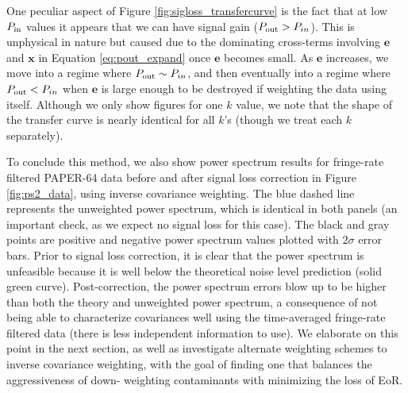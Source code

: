 \documentclass[preprint2,numberedappendix,tighten]{aastex6}  %
\begin{document}
One peculiar aspect of Figure \ref{fig:sigloss_transfercurve} is the fact that at low $P_{\rm in}$ values it appears that we can have 
signal gain ($P_{\rm out} > P_{in}$). This is unphysical in nature but caused due to the dominating cross-terms involving $\textbf{e}
$ and $\textbf{x}$ in Equation \eqref{eq:pout_expand} once $\textbf{e}$ becomes small. As $\textbf{e}$ increases, we move 
into a regime where $P_{\rm out} \sim P_{in}$, and then eventually into a regime where $P_{\rm out} < P_{in}$ when $\textbf{e}$ is 
large enough to be destroyed if weighting the data using itself. Although we only show figures for one $k$ value, we note that 
the shape of the transfer curve is nearly identical for all $k$'s (though we treat each $k$ separately).


To conclude this method, we also show power spectrum results for fringe-rate filtered PAPER-64 data before and after signal 
loss correction in Figure \ref{fig:ps2_data}, using inverse covariance weighting. The blue dashed line represents the unweighted 
power spectrum, which is identical in both panels (an important check, as we expect no signal loss for this case). The black and 
gray points are positive and negative power spectrum values plotted with $2\sigma$ error bars. Prior to signal loss correction, it 
is clear that the power spectrum is unfeasible because it is well below the theoretical noise level prediction (solid green curve). 
Post-correction, the power spectrum errors blow up to be higher than both the theory and unweighted power spectrum, a consequence of not being able to characterize covariances well using the time-averaged fringe-rate filtered data (there is less independent information to use). We elaborate on this point in the next section, as well as investigate alternate 
weighting schemes to inverse covariance weighting, with the goal of finding one that balances the aggressiveness of down-
weighting contaminants with minimizing the loss of EoR. 
\end{document}
